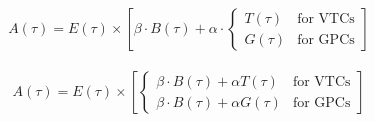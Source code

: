 \documentclass[11pt]{report}
\begin{document}
\begin{align}
    A(\tau) = E(\tau) \times \left[\beta \cdot B(\tau) + \alpha \cdot \begin{cases}
                                                                              T(\tau) & \text{for VTCs} \\
                                                                              G(\tau) & \text{for GPCs}
                                                                          \end{cases}\right]
\end{align}

\begin{align}
    A(\tau) = E(\tau) \times \left[\begin{cases}
                                           \beta \cdot B(\tau) + \alpha T(\tau)  & \text{for VTCs} \\
                                           \beta \cdot B(\tau) +  \alpha G(\tau) & \text{for GPCs}
                                       \end{cases}\right]
\end{align}







\end{document}
